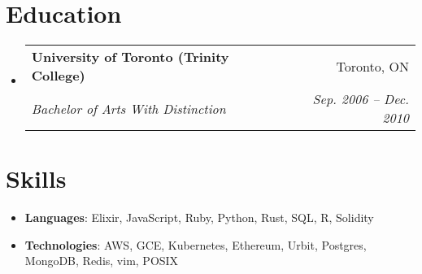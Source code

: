 \documentclass[letterpaper,11pt]{article}
\makeatletter
\newcommand{\resumeSubheading}[4]{
  \vspace{-1pt}\item
    \begin{tabular*}{0.97\textwidth}{l@{\extracolsep{\fill}}r}
      \textbf{#1} & #2 \\
      \textit{\small#3} & \textit{\small #4} \\
    \end{tabular*}\vspace{-5pt}
}
\newcommand{\resumeSubHeadingListStart}{\begin{itemize}[leftmargin=*]}
\newcommand{\resumeSubHeadingListEnd}{\end{itemize}}
\makeatother
\begin{document}
\section{Education}
  \resumeSubHeadingListStart
    \resumeSubheading
      {University of Toronto (Trinity College)}{Toronto, ON}
      {Bachelor of Arts With Distinction}{Sep. 2006 -- Dec. 2010}
  \resumeSubHeadingListEnd

%
\section{Skills}
  \resumeSubHeadingListStart
    \item{
      \textbf{Languages}{: Elixir, JavaScript, Ruby, Python, Rust, SQL, R, Solidity}
    }
    \item{
      \textbf{Technologies}{: AWS, GCE, Kubernetes, Ethereum, Urbit, Postgres, MongoDB, Redis, vim, POSIX}
    }
  \resumeSubHeadingListEnd


\end{document}
